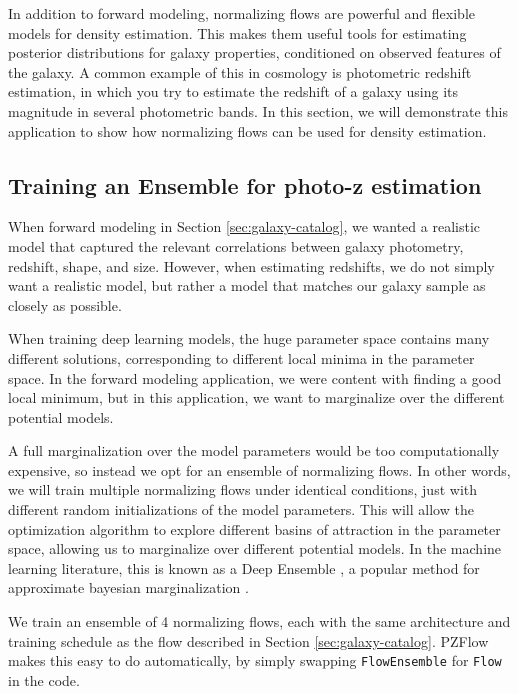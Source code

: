 \documentclass[twocolumn]{aastex631}
\begin{document}
In addition to forward modeling, normalizing flows are powerful and flexible models for density estimation.
This makes them useful tools for estimating posterior distributions for galaxy properties, conditioned on observed features of the galaxy.
A common example of this in cosmology is photometric redshift estimation, in which you try to estimate the redshift of a galaxy using its magnitude in several photometric bands.
In this section, we will demonstrate this application to show how normalizing flows can be used for density estimation.

\subsection{Training an Ensemble for photo-z estimation}

When forward modeling in Section \ref{sec:galaxy-catalog}, we wanted a realistic model that captured the relevant correlations between galaxy photometry, redshift, shape, and size.
However, when estimating redshifts, we do not simply want a realistic model, but rather a model that matches our galaxy sample as closely as possible.

When training deep learning models, the huge parameter space contains many different solutions, corresponding to different local minima in the parameter space.
In the forward modeling application, we were content with finding a good local minimum, but in this application, we want to marginalize over the different potential models.

A full marginalization over the model parameters would be too computationally expensive, so instead we opt for an ensemble of normalizing flows.
In other words, we will train multiple normalizing flows under identical conditions, just with different random initializations of the model parameters.
This will allow the optimization algorithm to explore different basins of attraction in the parameter space, allowing us to marginalize over different potential models.
In the machine learning literature, this is known as a Deep Ensemble \citep{lakshminarayanan2017}, a popular method for approximate bayesian marginalization \citep{wilson2020,fort2020}.

We train an ensemble of 4 normalizing flows, each with the same architecture and training schedule as the flow described in Section \ref{sec:galaxy-catalog}.
PZFlow makes this easy to do automatically, by simply swapping \texttt{FlowEnsemble} for \texttt{Flow} in the code.
\end{document}
